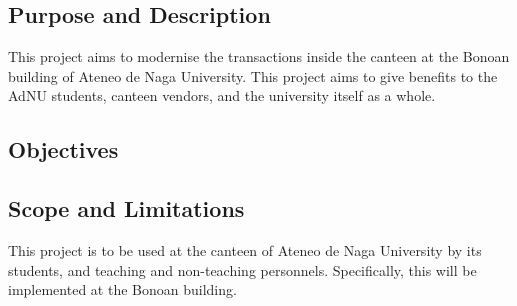 \documentclass{article}
\begin{document}







\subsection{Purpose and Description}
This project aims to modernise the transactions inside the canteen at the Bonoan building of Ateneo de Naga University. This project aims to give benefits to the AdNU students, canteen vendors, and the university itself as a whole.



\subsection{Objectives}

\subsection{Scope and Limitations}
This project is to be used at the canteen of Ateneo de Naga University by its students, and teaching and non-teaching personnels. Specifically, this will be implemented at the Bonoan building. 
\end{document}
